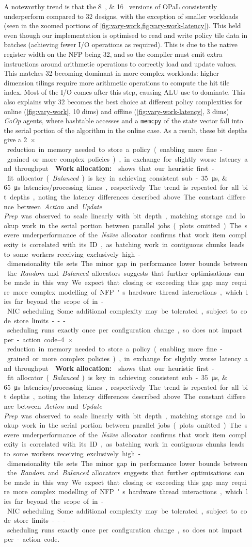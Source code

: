\documentclass[sigconf,natbib=false]{acmart}
\newcommand{\fakepara}[1]{\noindent\textbf{#1:}}
\newcommand{\approachshort}{OPaL}
\newcommand{\Coopfw}{\emph{CoOp}}
\begin{document}
A noteworthy trend is that the \SIlist{8;16}{\bit} versions of \approachshort{} consistently underperform compared to \SI{32}{\bit} designs, with the exception of smaller workloads (seen in the zoomed portions of \cref{fig:vary-work,fig:vary-work-latency}).
This held even though our implementation is optimised to read and write policy tile data in batches (achieving fewer I/O operations as required).
This is due to the native register width on the NFP being \SI{32}{\bit}, and so the compiler must emit extra instructions around arithmetic operations to correctly load and update values.
This matches \SI{32}{\bit} becoming dominant in more complex workloads: higher dimension tilings require more arithmetic operations to compute the hit tile index.
Most of the I/O comes after this step, causing ALU use to dominate.
This also explains why \SI{32}{\bit} becomes the best choice at different policy complexities for online (\cref{fig:vary-work}, 10 dims) and offline (\cref{fig:vary-work-latency}, 3 dims) \Coopfw{} agents, where hashtable accesses and a \texttt{memcpy} of the state vector fall into the serial portion of the algorithm in the online case.
As a result, these bit depths give a \SIrange{2}{4}{$\times$} reduction in memory needed to store a policy (enabling more fine-grained or more complex policies), in exchange for slightly worse latency and throughput.

\fakepara{Work allocation}
 shows that our heuristic first-fit allocator (\emph{Balanced}) is key in achieving consistent sub-\SIlist{35;65}{\micro\second} latencies/processing times, respectively.
The trend is repeated for all bit depths, noting the latency differences described above.
The constant difference between \emph{Action} and \emph{Update Prep} was observed to scale linearly with bit depth, matching storage and lookup work in the serial portion between parallel jobs (plots omitted).
The severe underperformance of the \emph{Na\"{i}ve} allocator confirms that work item complexity is correlated with its ID, as batching work in contiguous chunks leads to some workers receiving exclusively high-dimensionality tile sets.
The minor gap in performance lower bounds between the \emph{Random} and \emph{Balanced} allocators suggests that further optimisations can be made in this way.
We expect that closing or exceeding this gap may require more complex modelling of NFP's hardware thread interactions, which lies far beyond the scope of in-NIC scheduling.
Some additional complexity may be tolerated, subject to code store limits---scheduling runs exactly once per configuration change, so does not impact per-action code.
\end{document}
